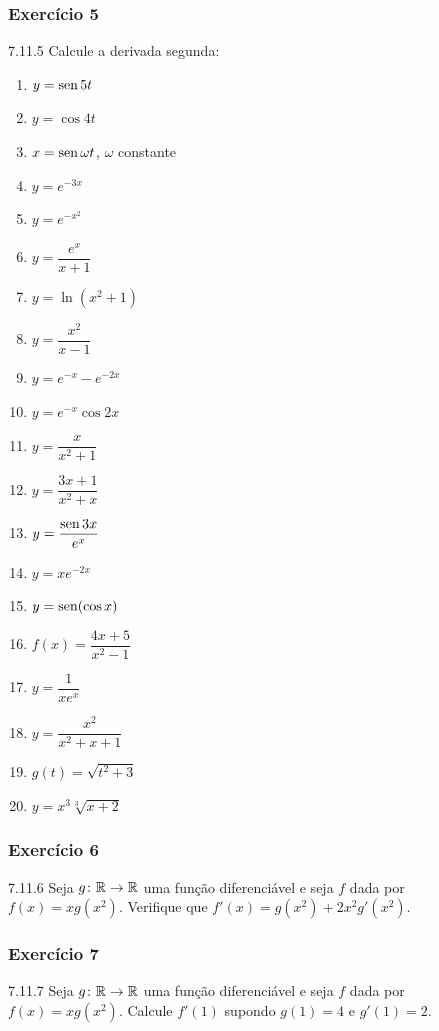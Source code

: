 \subsubsection*{Exercício 5}
\begin{exercicio}[5]{7.11.5}
Calcule a derivada segunda:
\begin{enumerate}[label=\alph*)]
    \item $y = \operatorname{sen} 5t$
    \item $y = \cos 4t$
    \item $x = \operatorname{sen}\omega t$, $\omega$ constante
    \item $y = e^{-3x}$
    \item $y = e^{-x^2}$
    \item $y = \dfrac{e^x}{x + 1}$
    \item $y = \ln(x^2 + 1)$
    \item $y = \dfrac{x^2}{x - 1}$
    \item $y = e^{-x} - e^{-2x}$
    \item $y = e^{-x}\cos 2x$
    \item $y = \dfrac{x}{x^2 + 1}$
    \item $y = \dfrac{3x + 1}{x^2 + x}$
    \item $y = \dfrac{\operatorname{sen} 3x}{e^x}$
    \item $y = xe^{-2x}$
    \item $y = \operatorname{sen}(\cos x)$
    \item $f(x) = \dfrac{4x + 5}{x^2 - 1}$
    \item $y = \dfrac{1}{xe^x}$
    \item $y = \dfrac{x^2}{x^2 + x + 1}$
    \item $g(t) = \sqrt{t^2 + 3}$
    \item $y = x^3 \sqrt[3]{x + 2}$
\end{enumerate}
\end{exercicio}

\subsubsection*{Exercício 6}
\begin{exercicio}[6]{7.11.6}
Seja $g\colon \mathbb{R} \to \mathbb{R}$ uma função diferenciável e seja $f$ dada por $f(x) = xg(x^2)$. Verifique que $f'(x) = g(x^2) + 2x^2 g'(x^2)$.
\end{exercicio}

\subsubsection*{Exercício 7}
\begin{exercicio}[7]{7.11.7}
Seja $g\colon \mathbb{R} \to \mathbb{R}$ uma função diferenciável e seja $f$ dada por $f(x) = xg(x^2)$. Calcule $f'(1)$ supondo $g(1) = 4$ e $g'(1) = 2$.
\end{exercicio}


